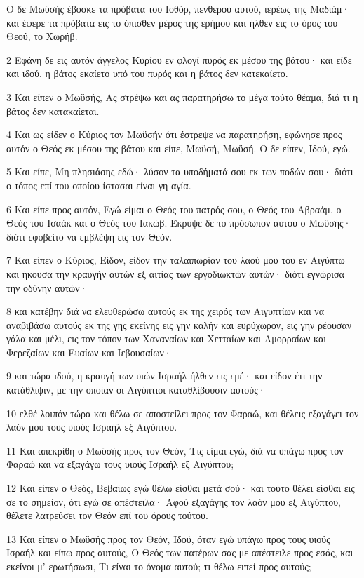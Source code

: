 \par Ο δε Μωϋσής έβοσκε τα πρόβατα του Ιοθόρ, πενθερού αυτού, ιερέως της Μαδιάμ· και έφερε τα πρόβατα εις το όπισθεν μέρος της ερήμου και ήλθεν εις το όρος του Θεού, το Χωρήβ.
\par 2 Εφάνη δε εις αυτόν άγγελος Κυρίου εν φλογί πυρός εκ μέσου της βάτου· και είδε και ιδού, η βάτος εκαίετο υπό του πυρός και η βάτος δεν κατεκαίετο.
\par 3 Και είπεν ο Μωϋσής, Ας στρέψω και ας παρατηρήσω το μέγα τούτο θέαμα, διά τι η βάτος δεν κατακαίεται.
\par 4 Και ως είδεν ο Κύριος τον Μωϋσήν ότι έστρεψε να παρατηρήση, εφώνησε προς αυτόν ο Θεός εκ μέσου της βάτου και είπε, Μωϋσή, Μωϋσή. Ο δε είπεν, Ιδού, εγώ.
\par 5 Και είπε, Μη πλησιάσης εδώ· λύσον τα υποδήματά σου εκ των ποδών σου· διότι ο τόπος επί του οποίου ίστασαι είναι γη αγία.
\par 6 Και είπε προς αυτόν, Εγώ είμαι ο Θεός του πατρός σου, ο Θεός του Αβραάμ, ο Θεός του Ισαάκ και ο Θεός του Ιακώβ. Έκρυψε δε το πρόσωπον αυτού ο Μωϋσής· διότι εφοβείτο να εμβλέψη εις τον Θεόν.
\par 7 Και είπεν ο Κύριος, Είδον, είδον την ταλαιπωρίαν του λαού μου του εν Αιγύπτω και ήκουσα την κραυγήν αυτών εξ αιτίας των εργοδιωκτών αυτών· διότι εγνώρισα την οδύνην αυτών·
\par 8 και κατέβην διά να ελευθερώσω αυτούς εκ της χειρός των Αιγυπτίων και να αναβιβάσω αυτούς εκ της γης εκείνης εις γην καλήν και ευρύχωρον, εις γην ρέουσαν γάλα και μέλι, εις τον τόπον των Χαναναίων και Χετταίων και Αμορραίων και Φερεζαίων και Ευαίων και Ιεβουσαίων·
\par 9 και τώρα ιδού, η κραυγή των υιών Ισραήλ ήλθεν εις εμέ· και είδον έτι την κατάθλιψιν, με την οποίαν οι Αιγύπτιοι καταθλίβουσιν αυτούς·
\par 10 ελθέ λοιπόν τώρα και θέλω σε αποστείλει προς τον Φαραώ, και θέλεις εξαγάγει τον λαόν μου τους υιούς Ισραήλ εξ Αιγύπτου.
\par 11 Και απεκρίθη ο Μωϋσής προς τον Θεόν, Τις είμαι εγώ, διά να υπάγω προς τον Φαραώ και να εξαγάγω τους υιούς Ισραήλ εξ Αιγύπτου;
\par 12 Και είπεν ο Θεός, Βεβαίως εγώ θέλω είσθαι μετά σού· και τούτο θέλει είσθαι εις σε το σημείον, ότι εγώ σε απέστειλα· Αφού εξαγάγης τον λαόν μου εξ Αιγύπτου, θέλετε λατρεύσει τον Θεόν επί του όρους τούτου.
\par 13 Και είπεν ο Μωϋσής προς τον Θεόν, Ιδού, όταν εγώ υπάγω προς τους υιούς Ισραήλ και είπω προς αυτούς, Ο Θεός των πατέρων σας με απέστειλε προς εσάς, και εκείνοι μ' ερωτήσωσι, Τι είναι το όνομα αυτού; τι θέλω ειπεί προς αυτούς;
